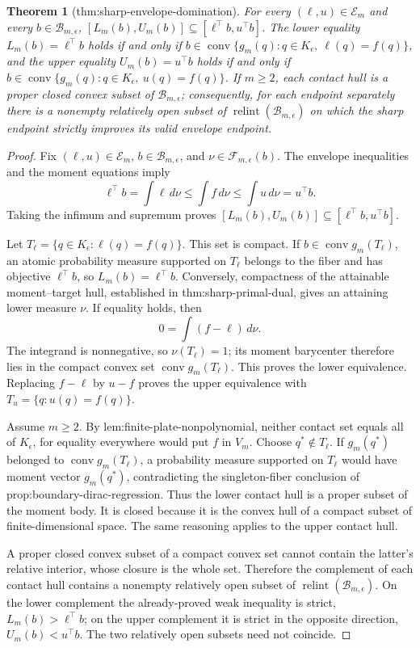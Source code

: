 \documentclass{article}
\newtheorem{theorem}{Theorem}
\begin{document}
\begin{theorem}[thm:sharp-envelope-domination]\label{thm:sharp-envelope-domination}
For every \((\ell,u)\in\mathcal E_m\) and every \(b\in\mathcal B_{m,\epsilon}\), \([L_m(b),U_m(b)]\subseteq[\ell^\top b,u^\top b]\). The lower equality \(L_m(b)=\ell^\top b\) holds if and only if \(b\in\operatorname{conv}\{g_m(q):q\in K_{\epsilon},\ \ell(q)=f(q)\}\), and the upper equality \(U_m(b)=u^\top b\) holds if and only if \(b\in\operatorname{conv}\{g_m(q):q\in K_{\epsilon},\ u(q)=f(q)\}\). If \(m\ge2\), each contact hull is a proper closed convex subset of \(\mathcal B_{m,\epsilon}\); consequently, for each endpoint separately there is a nonempty relatively open subset of \(\operatorname{relint}(\mathcal B_{m,\epsilon})\) on which the sharp endpoint strictly improves its valid envelope endpoint.
\end{theorem}
\begin{proof}
Fix \((\ell,u)\in\mathcal E_m\), \(b\in\mathcal B_{m,\epsilon}\), and \(\nu\in\mathcal F_{m,\epsilon}(b)\).  The envelope inequalities and the moment equations imply
\[
 \ell^{\top}b=\int\ell\,d\nu
 \leq\int f\,d\nu
 \leq\int u\,d\nu=u^{\top}b.
\]
Taking the infimum and supremum proves \([L_m(b),U_m(b)]\subseteq[\ell^{\top}b,u^{\top}b]\).

Let \(T_{\ell}=\{q\in K_{\epsilon}:\ell(q)=f(q)\}\).  This set is compact.  If \(b\in\operatorname{conv}g_m(T_{\ell})\), an atomic probability measure supported on \(T_{\ell}\) belongs to the fiber and has objective \(\ell^{\top}b\), so \(L_m(b)=\ell^{\top}b\).  Conversely, compactness of the attainable moment--target hull, established in thm:sharp-primal-dual, gives an attaining lower measure \(\nu\).  If equality holds, then
\[
 0=\int(f-\ell)\,d\nu.
\]
The integrand is nonnegative, so \(\nu(T_{\ell})=1\); its moment barycenter therefore lies in the compact convex set \(\operatorname{conv}g_m(T_{\ell})\).  This proves the lower equivalence.  Replacing \(f-\ell\) by \(u-f\) proves the upper equivalence with \(T_u=\{q:u(q)=f(q)\}\).

Assume \(m\geq2\).  By lem:finite-plate-nonpolynomial, neither contact set equals all of \(K_{\epsilon}\), for equality everywhere would put \(f\) in \(V_m\).  Choose \(q^*\notin T_{\ell}\).  If \(g_m(q^*)\) belonged to \(\operatorname{conv}g_m(T_{\ell})\), a probability measure supported on \(T_{\ell}\) would have moment vector \(g_m(q^*)\), contradicting the singleton-fiber conclusion of prop:boundary-dirac-regression.  Thus the lower contact hull is a proper subset of the moment body.  It is closed because it is the convex hull of a compact subset of finite-dimensional space.  The same reasoning applies to the upper contact hull.

A proper closed convex subset of a compact convex set cannot contain the latter's relative interior, whose closure is the whole set.  Therefore the complement of each contact hull contains a nonempty relatively open subset of \(\operatorname{relint}(\mathcal B_{m,\epsilon})\).  On the lower complement the already-proved weak inequality is strict, \(L_m(b)>\ell^{\top}b\); on the upper complement it is strict in the opposite direction, \(U_m(b)<u^{\top}b\).  The two relatively open subsets need not coincide.
\end{proof}
\end{document}
